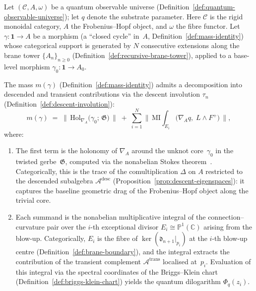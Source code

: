 \begin{theorem}
\label{thm:topological-mass}
Let $(\mathcal{C}, A, \omega)$ be a quantum observable universe
(Definition~\ref{def:quantum-observable-universe}); let $q$ denote the substrate parameter.  Here $\mathcal{C}$
is the rigid monoidal category, $A$ the Frobenius--Hopf object, and
$\omega$ the fibre functor.  Let
$\gamma \colon \mathbf{1} \to A$ be a morphism (a ``closed cycle'' in~$A$,
Definition~\ref{def:mass-identity}) whose categorical support is
generated by $N$ consecutive extensions along the brane tower
$\{A_n\}_{n \geq 0}$
(Definition~\ref{def:recursive-brane-tower}), applied to a base-level
morphism $\gamma_0 \colon \mathbf{1} \to A_0$.

The mass $m(\gamma)$ (Definition~\ref{def:mass-identity}) admits a
decomposition into descended and transient contributions via the
descent involution $\tau_n$
(Definition~\ref{def:descent-involution}):
\begin{equation}\label{eq:topological-mass-decomp}
  m(\gamma)
  \;=\;
  \bigl\lVert\,
  \mathrm{Hol}_{\nabla_A}\!\bigl(\gamma_0;\, \mathfrak{G}\bigr)
  \,\bigr\rVert
  \;+\;
  \sum_{i=1}^{N}
  \bigl\lVert\,
  \mathrm{MI}\!\!\int_{E_i}
  \bigl(\nabla_A q,\; L \wedge F^+\bigr)
  \,\bigr\rVert,
\end{equation}
where:
\begin{enumerate}
  \item The first term is the holonomy of $\nabla_A$ around the unknot
        core~$\gamma_0$ in the twisted gerbe~$\mathfrak{G}$, computed via the
        nonabelian Stokes theorem~\cite{yekutieli2015}.  Categorically,
        this is the trace of the comultiplication $\Delta$ on $A$
        restricted to the descended subalgebra
        $\mathcal{A}^{\mathrm{desc}}$
        (Proposition~\ref{prop:descent-eigenspaces}): it captures the
        baseline geometric drag of the Frobenius--Hopf object along the
        trivial core.
  \item Each summand is the nonabelian multiplicative integral of the
        connection--curvature pair over the $i$-th exceptional divisor
        $E_i \cong \mathbb{P}^1(\mathbb{C})$ arising from the blow-up.
        Categorically, $E_i$ is the fibre of
        $\ker(\mathfrak{d}_{n+1}|_{p_i})$ at the $i$-th blow-up centre
        (Definition~\ref{def:brane-boundary}), and the integral extracts
        the contribution of the transient complement
        $\mathcal{A}^{\mathrm{trans}}$ localised at~$p_i$.  Evaluation
        of this integral via the spectral coordinates of the Briggs--Klein
        chart (Definition~\ref{def:briggs-klein-chart}) yields the
        quantum dilogarithm $\Phi_q(z_i)$.
\end{enumerate}
\end{theorem}

